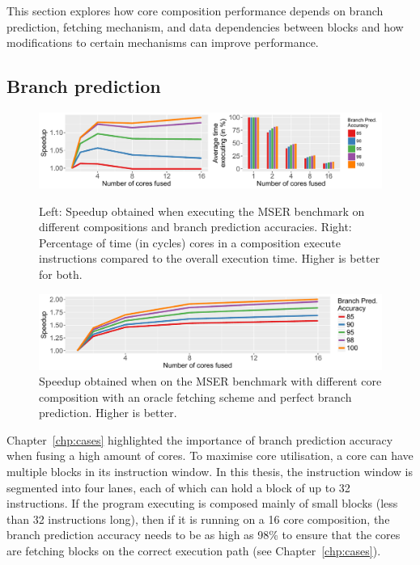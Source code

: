 This section explores how core composition performance depends on branch prediction, fetching mechanism, and data dependencies between blocks and how modifications to certain mechanisms can improve performance.
\vspace{-1em}
\subsection{Branch prediction}
\begin{figure}[t]
    \centering
    \includegraphics[width=1\textwidth]{chapter3/graphics/motiv_p1.pdf}
    \caption{Left: Speedup obtained when executing the MSER benchmark on different compositions and branch prediction accuracies.
	Right: Percentage of time (in cycles) cores in a composition execute instructions compared to the overall execution time. Higher is better for both.}
    \label{fig:mser_motiv}
    \centering
    \includegraphics[width=1\textwidth]{chapter3/graphics/perfect_fetch_motiv2.pdf}
    \caption{Speedup obtained when on the MSER benchmark with different core composition with an oracle fetching scheme and perfect branch prediction. Higher is better. }
    \label{fig:motivation_fetch}
	\vspace{1em}
\end{figure}
Chapter~\ref{chp:cases} highlighted the importance of branch prediction accuracy when fusing a high amount of cores.
To maximise core utilisation, a core can have multiple blocks in its instruction window.
In this thesis, the instruction window is segmented into four lanes, each of which can hold a block of up to 32 instructions.
If the program executing is composed mainly of small blocks (less than 32 instructions long), then if it is running on a 16 core composition, the branch prediction accuracy needs to be as high as 98\% to ensure that the cores are fetching blocks on the correct execution path (see Chapter~\ref{chp:cases}).


